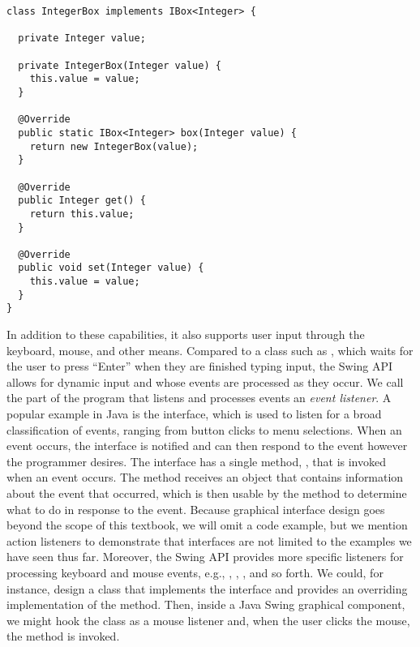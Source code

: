 \enlargethispage{-2\baselineskip}
\begin{lstlisting}[language=MyJava]
class IntegerBox implements IBox<Integer> {
  
  private Integer value;
  
  private IntegerBox(Integer value) { 
    this.value = value; 
  }
  
  @Override
  public static IBox<Integer> box(Integer value) { 
    return new IntegerBox(value); 
  }
  
  @Override
  public Integer get() { 
    return this.value; 
  }
  
  @Override
  public void set(Integer value) { 
    this.value = value; 
  }
}
\end{lstlisting}

In addition to these capabilities, it also supports user input through the keyboard, mouse, and other means. 
Compared to a class such as , which waits for the user to press ``Enter'' when they are finished typing input, the Swing API allows for dynamic input and whose events are processed as they occur.
We call the part of the program that listens and processes events an \emph{event listener}. 
A popular example in Java is the  interface, which is used to listen for a broad classification of events, ranging from button clicks to menu selections. 
When an event occurs, the  interface is notified and can then respond to the event however the programmer desires. 
The  interface has a single method, , that is invoked when an event occurs. 
The  method receives an  object that contains information about the event that occurred, which is then usable by the method to determine what to do in response to the event. 
Because graphical interface design goes beyond the scope of this textbook, we will omit a code example, but we mention action listeners to demonstrate that interfaces are not limited to the examples we have seen thus far. 
Moreover, the Swing API provides more specific listeners for processing keyboard and mouse events, e.g., , , , and so forth. 
We could, for instance, design a class that implements the  interface and provides an overriding implementation of the  method. 
Then, inside a Java Swing graphical component, we might hook the class as a mouse listener and, when the user clicks the mouse, the  method is invoked.

